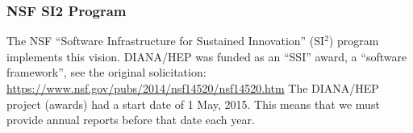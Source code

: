 \begin{frame}
\frametitle{NSF SI2 Program}

The NSF ``Software Infrastructure for Sustained Innovation'' (SI$^2$) program implements this vision. 
\vskip 0.15in
DIANA/HEP was funded as an ``SSI'' award, a ``software framework'', see the original solicitation:
\vskip 0.15in
\small{\url{https://www.nsf.gov/pubs/2014/nsf14520/nsf14520.htm}}
\vskip 0.15in
The DIANA/HEP project (awards) had a start date of 1 May, 2015. This means that we must provide annual reports before that date each year.
\end{frame}


